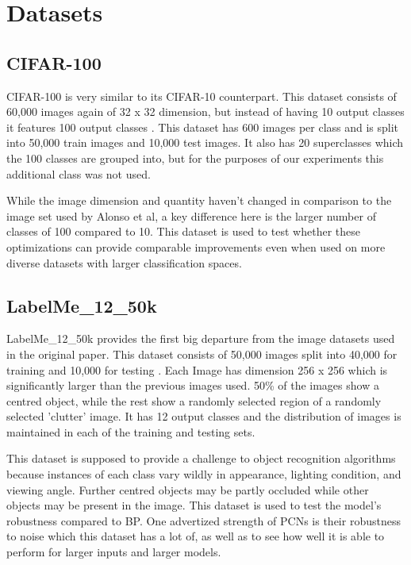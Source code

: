 \documentclass{article}
\theoremstyle{plain}
\theoremstyle{definition}
\theoremstyle{remark}
\begin{document}
\section{Datasets}

\subsection*{CIFAR-100}

CIFAR-100 is very similar to its CIFAR-10 counterpart. This dataset consists of 
60,000 images again of 32 x 32 dimension, but instead of having 10 output classes 
it features 100 output classes \cite{cifar100}. This dataset has 600 images per class and is split into
50,000 train images and 10,000 test images. It also has 20 superclasses which the 100 classes 
are grouped into, but for the purposes of our experiments this additional class was not used.

While the image dimension and quantity haven't changed in comparison to the image set
used by Alonso et al, a key difference here is the larger number of classes of 100 compared
to 10. This dataset is used to test whether these optimizations can provide comparable 
improvements even when used on more diverse datasets with larger classification spaces.

\subsection*{LabelMe\_12\_50k}

LabelMe\_12\_50k provides the first big departure from the image datasets used in the original 
paper. This dataset consists of 50,000 images split into 40,000 for training and 10,000
for testing \cite{labelme50k}. Each Image has dimension 256 x 256 which is significantly larger than the previous 
images used. 50\% of the images show a centred object, while the rest show a randomly selected region 
of a randomly selected 'clutter' image. It has 12 output classes and the distribution of images 
is maintained in each of the training and testing sets. 

This dataset is supposed to provide a challenge to object recognition algorithms 
because instances of each class vary wildly in appearance, lighting condition, and viewing angle.
Further centred objects may be partly occluded while other objects may be present in the image.
This dataset is used to test the model's robustness compared to BP. One advertized strength of 
PCNs is their robustness to noise which this dataset has a lot of, as well as to see how well it is 
able to perform for larger inputs and larger models.
\end{document}
